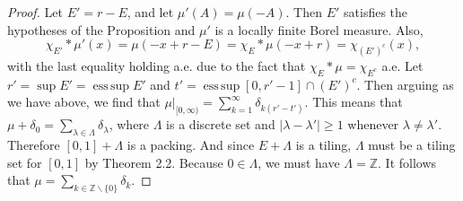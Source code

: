\documentclass[10pt,a4paper]{amsart}
\DeclareMathOperator{\esssup}{ess\,sup}
\begin{document}
\begin{proof}
    Let $E'=r-E$, and let $\mu'(A)=\mu(-A)$. Then $E'$ satisfies the hypotheses of the Proposition and $\mu'$ is a locally finite Borel measure. Also,
    $$\chi_{E'}*\mu'(x)=\mu(-x+r-E)=\chi_E*\mu(-x+r)=\chi_{(E')^c}(x),$$
    with the last equality holding a.e. due to the fact that $\chi_E*\mu=\chi_{E^c}$ a.e. Let $r'=\sup E'=\esssup E'$ and $t'=\esssup[0,r'-1]\cap (E')^c$. Then arguing as we have above, we find that $\mu|_{[0,\infty)}=\sum_{k=1}^\infty \delta_{k(r'-t')}$. This means that $\mu+\delta_0=\sum_{\lambda\in \Lambda}\delta_\lambda$, where $\Lambda$ is a discrete set and $|\lambda-\lambda'|\ge 1$ whenever $\lambda\neq\lambda'$. Therefore $[0,1]+\Lambda$ is a packing. And since $E+\Lambda$ is a tiling, $\Lambda$ must be a tiling set for $[0,1]$ by Theorem 2.2. Because $0\in\Lambda$, we must have $\Lambda=\mathbb{Z}$. It follows that $\mu=\sum_{k\in\mathbb{Z}\smallsetminus\{0\}}\delta_k$. \end{proof}
\end{document}
